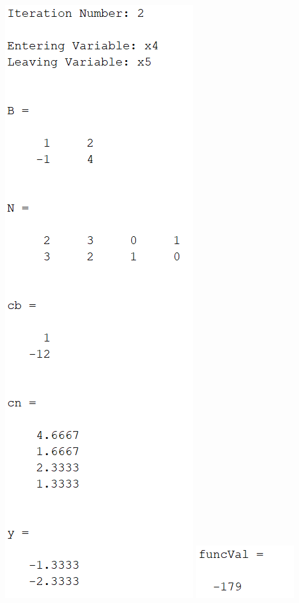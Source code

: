 \documentclass{article}
\begin{document}
\begin{itemize}
\begin{center}
        \includegraphics[scale = 0.7]{2_2_i_iter2}
        \newline
        \includegraphics[scale = 1]{2_2_i_min}

\end{center}
\end{itemize}
\end{document}
